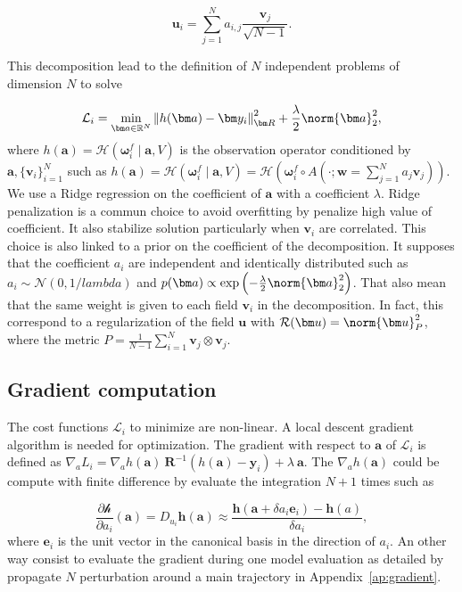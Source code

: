 \begin{equation*}
    \bm u_i =  \sum_{j = 1}^N a_{i,j} \frac{\bm v_j}{\sqrt{N - 1}}.
\end{equation*}

This decomposition lead to the definition of $N$ independent problems of dimension $N$ to solve

\begin{equation*}
    \mathcal L_i =  \min_{\bm a \in \mathbb R^N} \left\| h(\bm a) - \bm y_i\right\|_{\bm R}^2 + \frac{\lambda}{2} \norm{\bm a}^2_2,
\end{equation*}where  $h(\bm a) = \mathcal H(\bm \omega^f_i \mid \bm a,V)$ is the observation operator conditioned by $\bm a,\{\mathbf{v}_i\}_{i = 1}^N$ such as $h(\bm a) = \mathcal H(\bm \omega^f_i \mid \bm a,V) =\mathcal H(\bm \omega^f_i \circ A(\cdot; \bm w = \sum_{j = 1}^N a_{j} \bm v_j))$. We use a Ridge regression on the coefficient of $\bm a$ with a coefficient $\lambda$. Ridge penalization is a commun choice to avoid overfitting by penalize high value of coefficient. It also stabilize solution particularly when $\bm v_i$ are correlated. This choice is also linked to a prior on the coefficient of the decomposition. It supposes that the coefficient $a_i$ are independent and identically distributed such as $a_i \sim \mathcal N(0, 1/ lambda)$ and $p(\bm a) \propto \exp\left( - \frac{\lambda}{2} \norm{\bm a}_2^2\right)$. That also mean that the same weight is given to each field $\bm v_i$ in the decomposition. In fact, this correspond to a regularization of the field $\bm u$ with $\mathcal R(\bm u) = \norm{\bm u}^2_{P}$, where the metric $P = \frac{1}{N-1} \sum_{i = 1}^{N}\bm v_j \otimes \bm v_j$.

\subsection{Gradient computation}
The cost functions $\mathcal L_i$ to minimize are non-linear. A local descent gradient algorithm is needed for optimization. The gradient with respect to $\bm a$ of $\mathcal L_i$ is defined as $\nabla_a L_i = \nabla_a h(\bm a)~\bm R^{-1}(h(\bm a) - \bm y_i) + \lambda~\bm a$. The $\nabla_a h(\bm a)$ could be compute with finite difference by evaluate the integration $N+1$ times such as

\begin{equation*}
    \frac{\partial \mathcal h}{\partial a_i}(\bm a) = D_{u_i} \bm h(\bm a) \approx \frac{\bm h(\bm a + \delta a_i \bm e_i) - \bm h(a)}{\delta a_i},
\end{equation*}where $\bm e_i$ is the unit vector in the canonical basis in the direction of $a_i$. An other way consist to evaluate the gradient during one model evaluation as detailed by propagate $N$ perturbation around a main trajectory in Appendix~\ref{ap:gradient}.

